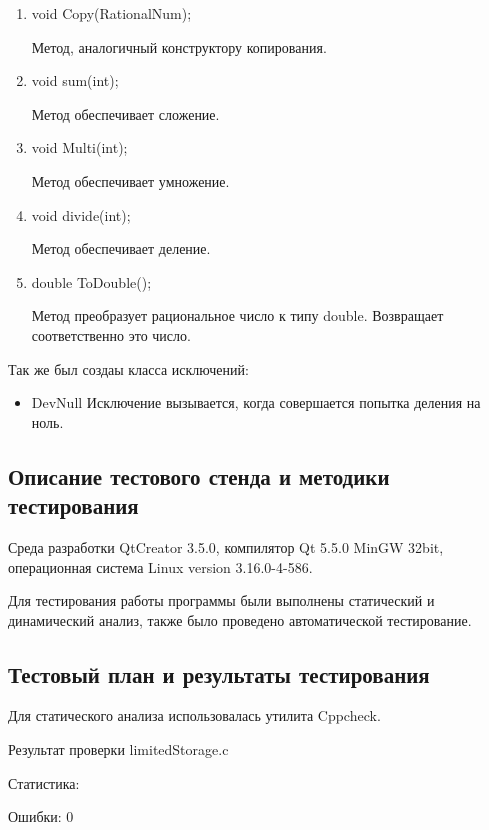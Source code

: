 \documentclass[12pt,a4paper]{report}
\begin{document}
\begin{enumerate}	
	\item void Copy(RationalNum);
	
	Метод, аналогичный конструктору копирования.
	
	\item void sum(int);
	
	Метод обеспечивает сложение. 
	
	\item void Multi(int);
	
	Метод обеспечивает умножение.
	
	\item void divide(int);
	
	Метод обеспечивает деление.
	
	\item double ToDouble();
	
	Метод преобразует рациональное число к типу double. Возвращает соответственно это число.
	
	

\end{enumerate}
	Так же был создаы класса исключений:
	
		\begin{itemize}
		\item DevNull
		Исключение вызывается, когда совершается попытка деления на ноль.
		\end{itemize}
		
		
\subsection{Описание тестового стенда и методики тестирования}
Среда разработки QtCreator 3.5.0, компилятор Qt 5.5.0 MinGW 32bit, операционная система Linux version 3.16.0-4-586.

Для тестирования работы программы были выполнены статический и динамический анализ, также было проведено автоматической тестирование.

\subsection{Тестовый план и результаты тестирования}

Для статического анализа использовалась утилита Cppcheck.

\vspace{\baselineskip}
Результат проверки limitedStorage.c 

Статистика:

Ошибки:	0
\end{document}
